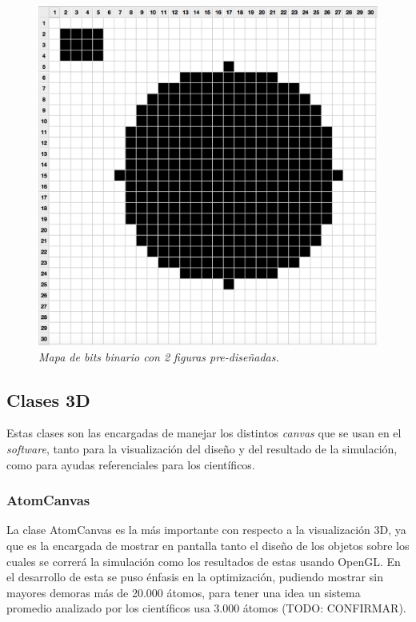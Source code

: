 \begin{figure}[H]
  \centering
  \includegraphics[scale=.5]{images/bitmapGrid}
  \caption{\em Mapa de bits binario con 2 figuras pre-diseñadas.}
\end{figure}

\subsection{Clases 3D}

Estas clases son las encargadas de manejar los distintos \emph{canvas} que se usan en el \emph{software}, tanto para la visualización del diseño y del resultado de la simulación, como para ayudas referenciales para los científicos.

\subsubsection{AtomCanvas}

La clase AtomCanvas es la más importante con respecto a la visualización 3D, ya que es la encargada de mostrar en pantalla tanto el diseño de los objetos sobre los cuales se correrá la simulación como los resultados de estas usando OpenGL. En el desarrollo de esta se puso énfasis en la optimización, pudiendo mostrar sin mayores demoras más de 20.000 átomos, para tener una idea un sistema promedio analizado por los científicos usa 3.000 átomos (TODO: CONFIRMAR).

